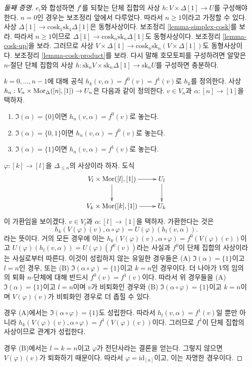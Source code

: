 \begin{proof}[둘째 증명]
$e_i$와 합성하면 $f^i$를 되찾는 단체 집합의 사상
$h : V \times \Delta[1] \to U$를 구성해야 한다. $n = 0$인 경우는
보조정리 앞에서 다루었다. 따라서 $n \geq 1$이라고 가정할 수 있다.
사상 $\Delta[1] \to \text{cosk}_1 \text{sk}_1 \Delta[1]$은
동형사상이다. 보조정리 \ref{lemma-simplex-cosk}를 보라. 따라서
$n \geq 1$이므로 $\Delta[1] \to \text{cosk}_n \text{sk}_n \Delta[1]$도
동형사상이다. 보조정리 \ref{lemma-cosk-up}을 보라. 그러므로 사상
$V \times \Delta[1] \to
\text{cosk}_n \text{sk}_n (V \times \Delta[1])$도 동형사상이다.
보조정리 \ref{lemma-cosk-product}를 보라. 다시 말해 호모토피를
구성하려면 알맞은 $n$-절단 단체 집합의 사상
$h : \text{sk}_n V \times \text{sk}_n \Delta[1] \to \text{sk}_n U$를
구성하면 충분하다.

\medskip\noindent
$k = 0, \ldots, n - 1$에 대해 공식
$h_k(v, \alpha) = f^0(v) = f^1(v)$로 $h_k$를 정의한다. 사상
$h_n : V_n \times \mathop{\mathrm{Mor}}\nolimits_{\Delta}([n], [1]) \to U_n$은 다음과 같이
정의한다. $v \in V_n$과 $\alpha : [n] \to [1]$을 택하자.
\begin{enumerate}
\item $\Im(\alpha) = \{0\}$이면 $h_n(v, \alpha) = f^0(v)$로 놓는다.
\item $\Im(\alpha) = \{0, 1\}$이면 $h_n(v, \alpha) = f^0(v)$로 놓는다.
\item $\Im(\alpha) = \{1\}$이면 $h_n(v, \alpha) = f^1(v)$로 놓는다.
\end{enumerate}
$\varphi : [k] \to [l]$을 $\Delta_{\leq n}$의 사상이라 하자. 도식
$$
\xymatrix{
V_{l} \times \Mor([l], [1]) \ar[r] \ar[d] & U_{l} \ar[d] \\
V_{k} \times \Mor([k], [1]) \ar[r] & U_{k}
}
$$
이 가환임을 보이겠다. $v \in V_{l}$과
$\alpha : [l] \to [1]$을 택하자. 가환한다는 것은
$$
h_k(V(\varphi)(v), \alpha \circ \varphi)
=
U(\varphi)(h_l(v, \alpha)).
$$
라는 뜻이다. 거의 모든 경우에 이는
$h_k(V(\varphi)(v), \alpha \circ \varphi) = f^0(V(\varphi)(v))$이고
$U(\varphi)(h_l(v, \alpha)) = U(\varphi)(f^0(v))$라는 사실과
$f^0$이 단체 집합의 사상이라는 사실로부터 따른다. 이것이 성립하지
않는 유일한 경우들은 (A) $\Im(\alpha) = \{1\}$이고 $l = n$인 경우,
또는 (B) $\Im(\alpha \circ \varphi) = \{1\}$이고 $k = n$인 경우이다.
더 나아가 $V$의 임의의 퇴화 $n$-단체에 대해 반드시
$f^0(v) = f^1(v)$이다. 따라서 위 경우들을 (A)
$\Im(\alpha) = \{1\}$이고 $l = n$이며 $v$가 비퇴화인 경우와 (B)
$\Im(\alpha \circ \varphi) = \{1\}$이고 $k = n$이며
$V(\varphi)(v)$가 비퇴화인 경우로 더 좁힐 수 있다.

\medskip\noindent
경우 (A)에서는 $\Im(\alpha \circ \varphi) = \{1\}$도 성립한다.
따라서 $h_l(v, \alpha) = f^1(v)$일 뿐만 아니라
$h_k(V(\varphi)(v), \alpha \circ \varphi) = f^1(V(\varphi)(v))$이다.
그러므로 $f^1$이 단체 집합의 사상이므로 관계가 성립한다.

\medskip\noindent
경우 (B)에서는 $l = k = n$이고 $\varphi$가 전단사라는 결론을 얻는다.
그렇지 않으면 $V(\varphi)(v)$가 퇴화하기 때문이다. 따라서
$\varphi = \text{id}_{[n]}$이고, 이는 자명한 경우이다.
\end{proof}


